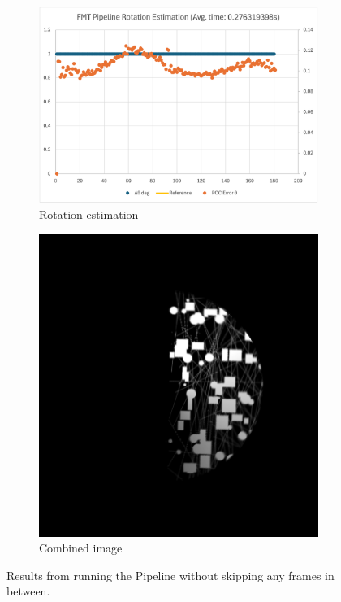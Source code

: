 \begin{figure}[H]
    \centering
    \begin{subfigure}[b]{.45\textwidth}
        \centering
        \includegraphics[width=\textwidth]{figures/results/rotation-skip-0/PC-Rotation.png}
        \caption{Rotation estimation}
        \label{sfig:pcrotation}
    \end{subfigure}
    \hfill
    \begin{subfigure}[b]{.45\textwidth}
        \centering
        \includegraphics[width=\textwidth]{figures/results/rotation-skip-0/PC.png}
        \caption{Combined image}
        \label{sfig:pccombined-skip-0}
    \end{subfigure}
    \caption[\citeauthor{Hurtos2015} Pipeline Rotation Estimation Results]{Results from running the \citeauthor{Hurtos2015} Pipeline without skipping any frames in between.}
    \label{fig:subfig}
\end{figure}

